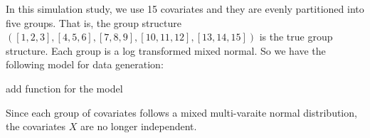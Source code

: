 

\title{}
\author{Pan Chao}
\date{\today}


\maketitle

In this simulation study, we use 15 covariates and they are evenly partitioned into five groups. That is, the group structure $([1,2,3], [4,5,6], [7,8,9], [10, 11, 12], [13, 14, 15])$ is the true group structure. Each group is a log transformed mixed normal. So we have the following model for data generation:

{\color{red}add function for the model}

Since each group of covariates follows a mixed multi-varaite normal distribution, the covariates $X$ are no longer independent.

